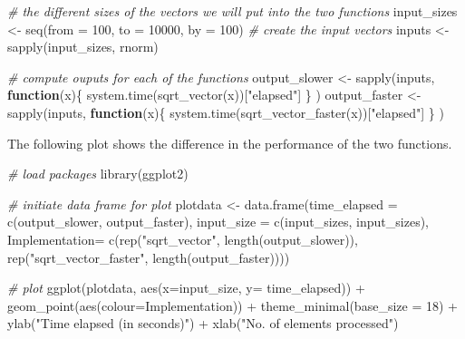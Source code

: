 \documentclass[
  12pt,
]{style/krantz}
\newenvironment{Shaded}{\begin{snugshade}}{\end{snugshade}}
\newcommand{\AttributeTok}[1]{\textcolor[rgb]{0.77,0.63,0.00}{#1}}
\newcommand{\CommentTok}[1]{\textcolor[rgb]{0.56,0.35,0.01}{\textit{#1}}}
\newcommand{\ControlFlowTok}[1]{\textcolor[rgb]{0.13,0.29,0.53}{\textbf{#1}}}
\newcommand{\DecValTok}[1]{\textcolor[rgb]{0.00,0.00,0.81}{#1}}
\newcommand{\FunctionTok}[1]{\textcolor[rgb]{0.00,0.00,0.00}{#1}}
\newcommand{\NormalTok}[1]{#1}
\newcommand{\OtherTok}[1]{\textcolor[rgb]{0.56,0.35,0.01}{#1}}
\newcommand{\SpecialCharTok}[1]{\textcolor[rgb]{0.00,0.00,0.00}{#1}}
\newcommand{\StringTok}[1]{\textcolor[rgb]{0.31,0.60,0.02}{#1}}
\begin{document}
\begin{Shaded}
\begin{Highlighting}[]
\CommentTok{\# the different sizes of the vectors we will put into the two functions}
\NormalTok{input\_sizes }\OtherTok{\textless{}{-}} \FunctionTok{seq}\NormalTok{(}\AttributeTok{from =} \DecValTok{100}\NormalTok{, }\AttributeTok{to =} \DecValTok{10000}\NormalTok{, }\AttributeTok{by =} \DecValTok{100}\NormalTok{)}
\CommentTok{\# create the input vectors}
\NormalTok{inputs }\OtherTok{\textless{}{-}} \FunctionTok{sapply}\NormalTok{(input\_sizes, rnorm)}

\CommentTok{\# compute ouputs for each of the functions}
\NormalTok{output\_slower }\OtherTok{\textless{}{-}} 
     \FunctionTok{sapply}\NormalTok{(inputs, }
            \ControlFlowTok{function}\NormalTok{(x)\{ }\FunctionTok{system.time}\NormalTok{(}\FunctionTok{sqrt\_vector}\NormalTok{(x))[}\StringTok{"elapsed"}\NormalTok{]}
\NormalTok{                 \}}
\NormalTok{            )}
\NormalTok{output\_faster }\OtherTok{\textless{}{-}} 
     \FunctionTok{sapply}\NormalTok{(inputs, }
            \ControlFlowTok{function}\NormalTok{(x)\{ }\FunctionTok{system.time}\NormalTok{(}\FunctionTok{sqrt\_vector\_faster}\NormalTok{(x))[}\StringTok{"elapsed"}\NormalTok{]}
\NormalTok{                 \}}
\NormalTok{            )}
\end{Highlighting}
\end{Shaded}

The following plot shows the difference in the performance of the two functions.

\begin{Shaded}
\begin{Highlighting}[]
\CommentTok{\# load packages}
\FunctionTok{library}\NormalTok{(ggplot2)}

\CommentTok{\# initiate data frame for plot}
\NormalTok{plotdata }\OtherTok{\textless{}{-}} \FunctionTok{data.frame}\NormalTok{(}\AttributeTok{time\_elapsed =} \FunctionTok{c}\NormalTok{(output\_slower, output\_faster),}
                       \AttributeTok{input\_size =} \FunctionTok{c}\NormalTok{(input\_sizes, input\_sizes),}
                       \AttributeTok{Implementation=} \FunctionTok{c}\NormalTok{(}\FunctionTok{rep}\NormalTok{(}\StringTok{"sqrt\_vector"}\NormalTok{, }\FunctionTok{length}\NormalTok{(output\_slower)),}
                            \FunctionTok{rep}\NormalTok{(}\StringTok{"sqrt\_vector\_faster"}\NormalTok{, }\FunctionTok{length}\NormalTok{(output\_faster))))}

\CommentTok{\# plot}
\FunctionTok{ggplot}\NormalTok{(plotdata, }\FunctionTok{aes}\NormalTok{(}\AttributeTok{x=}\NormalTok{input\_size, }\AttributeTok{y=}\NormalTok{ time\_elapsed)) }\SpecialCharTok{+}
     \FunctionTok{geom\_point}\NormalTok{(}\FunctionTok{aes}\NormalTok{(}\AttributeTok{colour=}\NormalTok{Implementation)) }\SpecialCharTok{+}
     \FunctionTok{theme\_minimal}\NormalTok{(}\AttributeTok{base\_size =} \DecValTok{18}\NormalTok{) }\SpecialCharTok{+}
     \FunctionTok{ylab}\NormalTok{(}\StringTok{"Time elapsed (in seconds)"}\NormalTok{) }\SpecialCharTok{+}
     \FunctionTok{xlab}\NormalTok{(}\StringTok{"No. of elements processed"}\NormalTok{)}
\end{Highlighting}
\end{Shaded}
\end{document}
